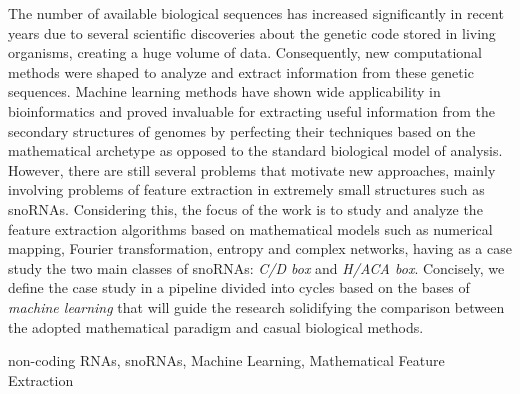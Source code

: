 The number of available biological sequences has increased significantly in recent years due to several scientific discoveries about the genetic code stored in living organisms, creating a huge volume of data. Consequently, new computational methods were shaped to analyze and extract information from these genetic sequences. Machine learning methods have shown wide applicability in bioinformatics and proved invaluable for extracting useful information from the secondary structures of genomes by perfecting their techniques based on the mathematical archetype as opposed to the standard biological model of analysis. However, there are still several problems that motivate new approaches, mainly involving problems of feature extraction in extremely small structures such as snoRNAs. Considering this, the focus of the work is to study and analyze the feature extraction algorithms based on mathematical models such as numerical mapping, Fourier transformation, entropy and complex networks, having as a case study the two main classes of snoRNAs: \textit {C/D box} and \textit{H/ACA box}. Concisely, we define the case study in a pipeline divided into cycles based on the bases of \textit{machine learning} that will guide the research solidifying the comparison between the adopted mathematical paradigm and casual biological methods.

\begin{keywords}
non-coding RNAs, snoRNAs, Machine Learning, Mathematical Feature Extraction
\end{keywords}